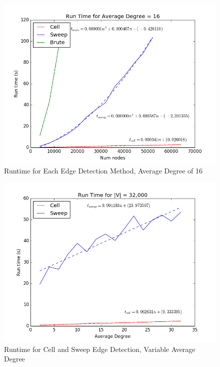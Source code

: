 \documentclass{article}
\begin{document}
\begin{figure}
    \centering
    \includegraphics[scale=0.6]{./graphs/run_time_avg_deg_16.png}
    \caption{Runtime for Each Edge Detection Method, Average Degree of 16}
    \label{avgdeg}
\end{figure}

\begin{figure}
    \centering
    \includegraphics[scale=0.6]{./graphs/run_time_var_avg_deg.png}
    \caption{Runtime for Cell and Sweep Edge Detection, Variable Average Degree}
    \label{varavgdeg}
\end{figure}
\end{document}
